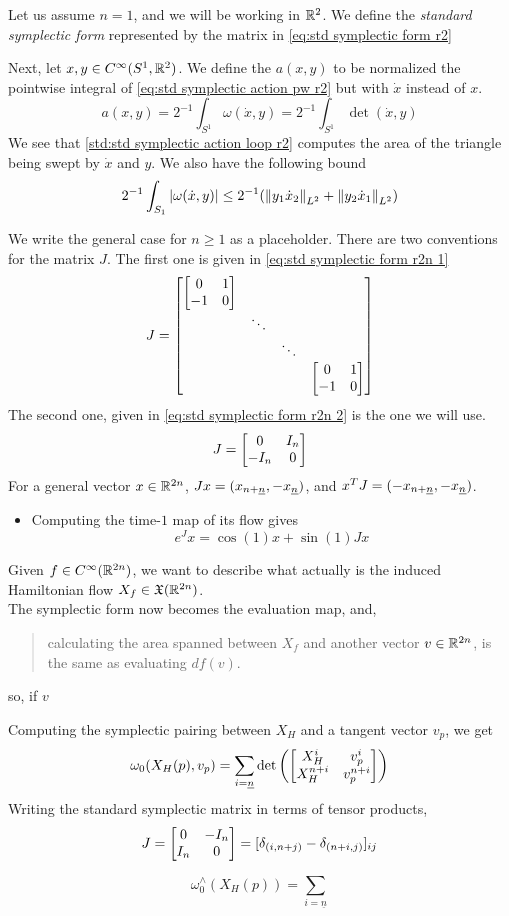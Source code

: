 \documentclass[../main-v2-manifolds.tex]{subfiles}
\begin{document}
Let us assume $n=1$, and we will be working in $\mathbb{R}^{2}$. We define the \emph{standard symplectic form} represented by the matrix in \cref{eq:std symplectic form r2}


Next, let $x,y\in C^\infty(S^1,\mathbb{R}^{2})$. We define the $a(x,y)$ to be normalized the pointwise integral of \cref{eq:std symplectic action pw r2} but with $\dot{x}$ instead of $x$.
\begin{equation}
    a(x,y) = 2^{-1}\int_{S^1}\omega(\dot{x},y)= 2^{-1}\int_{S^1}\det(\dot{x},y)
    \label{std:std symplectic action loop r2}
\end{equation}
We see that \cref{std:std symplectic action loop r2} computes the area of the triangle being swept by $\dot{x}$ and $y$. We also have the following bound
\[
    2^{-1}\int_{S_1}\vert {\omega(\dot{x},y)} \vert\leq 2^{-1}(\norm{y_1\dot{x}_2}_{L^2} + \norm{y_2\dot{x}_1}_{L^2})
\]

%
%
%
%
We write the general case for $n\geq 1$ as a placeholder. There are two conventions for the matrix $J$. The first one is given in \cref{eq:std symplectic form r2n 1}
\begin{equation}
    J = \begin{bmatrix}
        \dmat{\symatrix,\ddots,\ddots,\symatrix}
    \end{bmatrix}
    \label{eq:std symplectic form r2n 1}
\end{equation}
The second one, given in \cref{eq:std symplectic form r2n 2} is the one we will use.
\begin{equation}
    J =\begin{bmatrix}
        \admat[0]{I_n,-I_n}
    \end{bmatrix}
    \label{eq:std symplectic form r2n 2}
\end{equation}
%
%
%
For a general vector $x\in{\mathbb{R}^{2n}}$, $Jx = (\UL{x}[n+][n],-\UL{x}[n])$, and $x^TJ = (-\UL{x}[n+][n],-\UL{x}[n])$. 
\begin{itemize}
    \item Computing the time-$1$ map of its flow gives
    \[
        e^Jx = \cos(1)x + \sin(1)Jx
    \]
\end{itemize}
Given $f\in C^\infty({\mathbb{R}^{2n}})$, we want to describe what actually is the induced Hamiltonian flow $X_f\in \mathfrak{X}({\mathbb{R}^{2n}})$.\\

The symplectic form now becomes the evaluation map, and,
\begin{quote}
    calculating the area spanned between $X_f$ and another vector $v\in {\mathbb{R}^{2n}}$, is the same as evaluating $df(v)$.
\end{quote}
so, if $v$ 


Computing the symplectic pairing between $X_H$ and a tangent vector $v_p$, we get
\[
\omega_0\qty(X_H(p),v_p) = \sum_{i=\underline{n}} \det\qty(\mqty[X_H^i & v_p^i \\ X_H^{n+i} & v_p^{n+i}])
\]
Writing the standard symplectic matrix in terms of tensor products, 
\[
    J = \mqty[ 0 & -I_n \\ I_n & 0] = [\delta_{(i,n+j)} - \delta_{(n+i,j)}]_{ij}
\]

\[
    \omega_0^{\wedge}(X_H(p)) = \sum_{i=\underline{n}}
\]
\end{document}
